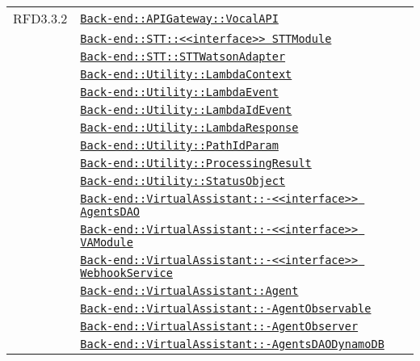 \begin{longtable}{|>{\centering}m{3cm}|m{10cm}<{\centering}|}
RFD3.3.2 & \hyperref[Back-end::APIGateway::VocalAPI]{\texttt{Back-end::APIGateway::VocalAPI}}\\
& \hyperref[Back-end::STT::<<interface>> STTModule]{\texttt{Back-end::STT::<<interface>> STTModule}}\\
& \hyperref[Back-end::STT::STTWatsonAdapter]{\texttt{Back-end::STT::STTWatsonAdapter}}\\
& \hyperref[Back-end::Utility::LambdaContext]{\texttt{Back-end::Utility::LambdaContext}}\\
& \hyperref[Back-end::Utility::LambdaEvent]{\texttt{Back-end::Utility::LambdaEvent}}\\
& \hyperref[Back-end::Utility::LambdaIdEvent]{\texttt{Back-end::Utility::LambdaIdEvent}}\\
& \hyperref[Back-end::Utility::LambdaResponse]{\texttt{Back-end::Utility::LambdaResponse}}\\
& \hyperref[Back-end::Utility::PathIdParam]{\texttt{Back-end::Utility::PathIdParam}}\\
& \hyperref[Back-end::Utility::ProcessingResult]{\texttt{Back-end::Utility::ProcessingResult}}\\
& \hyperref[Back-end::Utility::StatusObject]{\texttt{Back-end::Utility::StatusObject}}\\
& \hyperref[Back-end::VirtualAssistant::<<interface>> AgentsDAO]{\texttt{Back-end::VirtualAssistant::-\linebreak <<interface>> AgentsDAO}}\\
& \hyperref[Back-end::VirtualAssistant::<<interface>> VAModule]{\texttt{Back-end::VirtualAssistant::-\linebreak <<interface>> VAModule}}\\
& \hyperref[Back-end::VirtualAssistant::<<interface>> WebhookService]{\texttt{Back-end::VirtualAssistant::-\linebreak <<interface>> WebhookService}}\\
& \hyperref[Back-end::VirtualAssistant::Agent]{\texttt{Back-end::VirtualAssistant::Agent}}\\
& \hyperref[Back-end::VirtualAssistant::AgentObservable]{\texttt{Back-end::VirtualAssistant::-\linebreak AgentObservable}}\\
& \hyperref[Back-end::VirtualAssistant::AgentObserver]{\texttt{Back-end::VirtualAssistant::-\linebreak AgentObserver}}\\
& \hyperref[Back-end::VirtualAssistant::AgentsDAODynamoDB]{\texttt{Back-end::VirtualAssistant::-\linebreak AgentsDAODynamoDB}}\\

\end{longtable}
